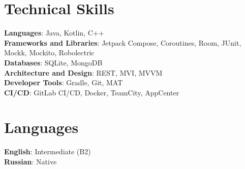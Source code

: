 \documentclass[letterpaper,11pt]{article}
\begin{document}
%
\section{Technical Skills}
 \begin{itemize}[leftmargin=0.15in, label={}]
    \small{\item{
     \textbf{Languages}{: Java, Kotlin, C++} \\
     \textbf{Frameworks and Libraries}{: Jetpack Compose, Coroutines, Room, JUnit, Mockk, Mockito, Robolectric } \\
     \textbf{Databases}{: SQLite, MongoDB } \\
     \textbf{Architecture and Design}{: REST, MVI, MVVM } \\
     \textbf{Developer Tools}{: Gradle, Git, MAT } \\
     \textbf{CI/CD}{: GitLab CI/CD, Docker, TeamCity, AppCenter} \\
    }}
 \end{itemize}


\section{Languages}
 \begin{itemize}[leftmargin=0.15in, label={}]
    \small{\item{
     \textbf{English}{: Intermediate (B2)} \\
     \textbf{Russian}{: Native}
    }}
 \end{itemize}

\end{document}
